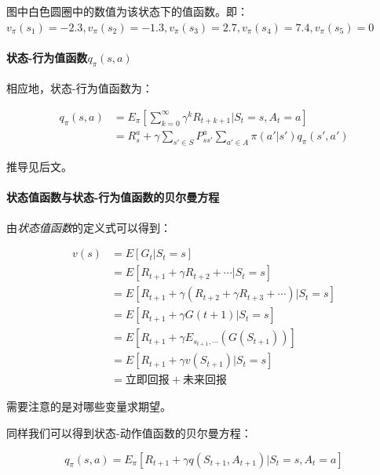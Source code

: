 \documentclass[UTF8,a4paper,12pt]{ctexbook}
\begin{document}
				图中白色圆圈中的数值为该状态下的值函数。即：$v_\pi(s_1) = -2.3, v_\pi(s_2) = -1.3, v_\pi(s_3) = 2.7, v_\pi(s_4) = 7.4, v_\pi(s_5) = 0$
				
			\paragraph{状态-行为值函数$q_\pi(s,a)$}
				相应地，状态-行为值函数为：
				
				\begin{equation}
					\begin{aligned}
					q_\pi(s,a) &= E_\pi \left[\sum_{k=0}^{\infty}\gamma^k R_{t+k+1}|S_t = s, A_t = a \right]\\
							&= R_s^a + \gamma \sum_{s'\in S} P_{ss'}^a\sum_{a'\in A}\pi(a'|s')q_\pi(s', a')
					\end{aligned}
				\end{equation}
				
				推导见后文。		
			
			\paragraph{状态值函数与状态-行为值函数的贝尔曼方程}
				由\textit{状态值函数}的定义式可以得到：
				
				\begin{equation}
					\begin{aligned}
						v(s) &= E[G_t|S_t = s]	\\
							&= E[R_{t+1} + \gamma R_{t+2} + \cdots | S_t = s] \\
							&= E[R_{t+1} + \gamma (R_{t+2} + \gamma R_{t+3} + \cdots)|S_t = s]\\
							&= E[R_{t+1} + \gamma G(t+1)|S_t = s]	\\
							&= E[R_{t+1} + \gamma E_{s_{t+1},\cdots}(G(S_{t+1}))]	\\
							&= E[R_{t+1} + \gamma v(S_{t+1})|S_t = s]	\\
							&= \textit{立即回报} + \textit{未来回报}
					\end{aligned}
				\end{equation}
				
				需要注意的是对哪些变量求期望。
				
				同样我们可以得到状态-动作值函数的贝尔曼方程：
				
				\begin{equation}
					q_\pi(s,a) = E_\pi[R_{t+1} + \gamma q(S_{t+1},A_{t+1})|S_t = s, A_t = a]
				\end{equation}
				
\end{document}
